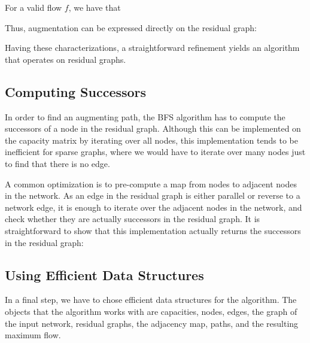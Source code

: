 \documentclass{llncs}
\begin{document}
  For a valid flow $f$, we have that
    
  Thus, augmentation can be expressed directly on the residual graph:
  
  Having these characterizations, a straightforward refinement yields an algorithm that operates on residual graphs.

      
  \subsection{Computing Successors}
  In order to find an augmenting path, the BFS algorithm has to compute the successors of a node in the residual graph. 
  Although this can be implemented on the capacity matrix by iterating over all nodes, this implementation tends to be inefficient for sparse graphs,
  where we would have to iterate over many nodes just to find that there is no edge.
  
  A common optimization is to pre-compute a map from nodes to adjacent nodes in the network. As an edge in the residual graph is either parallel or reverse to 
  a network edge, it is enough to iterate over the adjacent nodes in the network, and check whether they are actually successors in the residual graph.
  It is straightforward to show that this implementation actually returns the successors in the residual graph:

  \subsection{Using Efficient Data Structures}    
  In a final step, we have to chose efficient data structures for the algorithm. The objects that the algorithm works with are
  capacities, nodes, edges, the graph of the input network, residual graphs, the adjacency map, paths, and the resulting maximum flow. 
  
\end{document}
